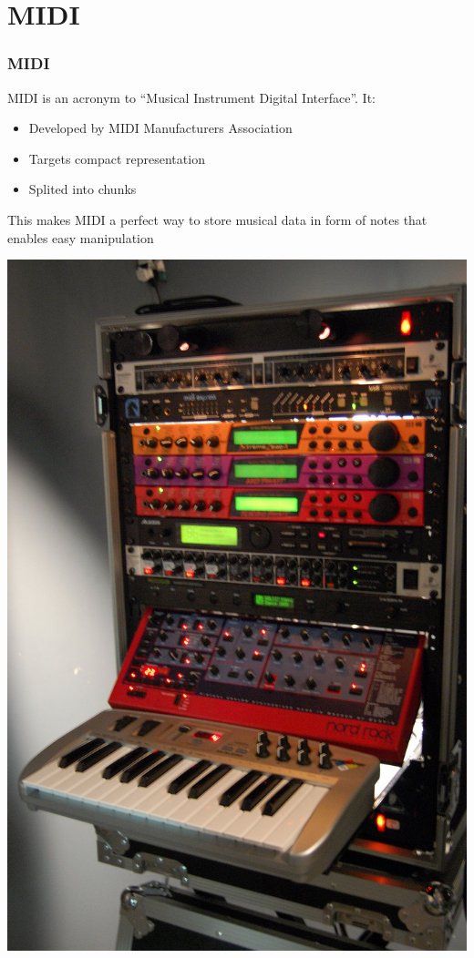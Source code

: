 \documentclass[12pt]{beamer}
\begin{document}
    \section{MIDI}
        \begin{frame}
            \frametitle{MIDI}
            MIDI is an acronym to ``Musical Instrument Digital Interface''. It:
            \begin{itemize}
                \item Developed by MIDI Manufacturers Association
                \item Targets compact representation
                \item Splited into chunks
            \end{itemize}
            This makes MIDI a perfect way to store musical data in form of notes that enables easy manipulation\\
            \begin{center}
                \includegraphics[scale=0.04]{midi}\hspace{1cm}

\end{center}
\end{frame}
\end{document}
